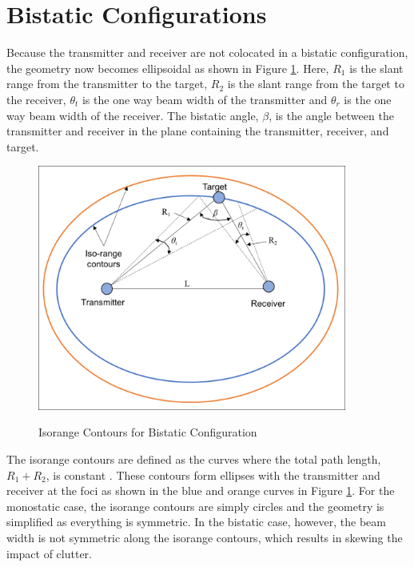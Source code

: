 \section{Bistatic Configurations}
Because the transmitter and receiver are not colocated in a bistatic configuration, the geometry now becomes ellipsoidal as shown in Figure \ref{intro_fig:2}. Here, $R_1$ is the slant range from the transmitter to the target, $R_2$ is the slant range from the target to the receiver, $\theta_t$ is the one way beam width of the transmitter and $\theta_r$ is the one way beam width of the receiver. The bistatic angle, $\beta$, is the angle between the transmitter and receiver in the plane containing the transmitter, receiver, and target. 
\begin{figure}[H]
  \begin{center}
\includegraphics[width=4in]{../media/multistatic/Isorange_contours.png}
  \end{center}
  \renewcommand{\baselinestretch}{1} \small\normalsize
  \begin{quote}
    \caption[Isorange Contours for Bistatic Configuration]{Isorange Contours for Bistatic Configuration \label{intro_fig:2}}
  \end{quote}
\end{figure}
\renewcommand{\baselinestretch}{2} \small\normalsize
The isorange contours are defined as the curves where the total path length, $R_1 + R_2$, is constant . These contours form ellipses with the transmitter and receiver at the foci as shown in the blue and orange curves in Figure \ref{intro_fig:2}. For the monostatic case, the isorange contours are simply circles and the geometry is simplified as everything is symmetric. In the bistatic case, however, the beam width is not symmetric along the isorange contours, which results in skewing the impact of clutter.

